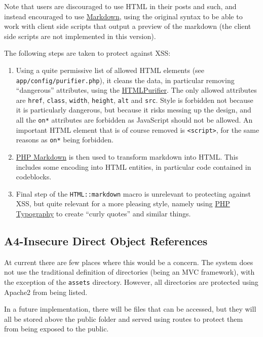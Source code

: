 Note that users are discouraged to use HTML in their posts and such, and
instead encouraged to use
\href{http://daringfireball.net/projects/markdown/}{Markdown}, using the
original syntax to be able to work with client side scripts that output
a preview of the markdown (the client side scripts are not implemented
in this version).

The following steps are taken to protect against XSS:

\begin{enumerate}[1.]
\item
  Using a quite permissive list of allowed HTML elements (see
  \texttt{app/config/purifier.php}), it cleans the data, in particular
  removing ``dangerous'' attributes, using the
  \href{http://htmlpurifier.org/}{HTMLPurifier}. The only allowed
  attributes are \texttt{href}, \texttt{class}, \texttt{width},
  \texttt{height}, \texttt{alt} and \texttt{src}. Style is forbidden not
  because it is particularly dangerous, but because it risks messing up
  the design, and all the \texttt{on*} attributes are forbidden as
  JavaScript should not be allowed. An important HTML element that is of
  course removed is \texttt{\textless{}script\textgreater{}}, for the
  same reasons as \texttt{on*} being forbidden.
\item
  \href{http://michelf.ca/projects/php-markdown/}{PHP Markdown} is then
  used to transform markdown into HTML. This includes some encoding into
  HTML entities, in particular code contained in codeblocks.
\item
  Final step of the \texttt{HTML::markdown} macro is unrelevant to
  protecting against XSS, but quite relevant for a more pleasing style,
  namely using \href{https://github.com/adamaveray/PHPTypography}{PHP
  Typography} to create ``curly quotes'' and similar things.
\end{enumerate}

\subsection{A4-Insecure Direct Object References}

At current there are few places where this would be a concern. The
system does not use the traditional definition of directories (being an
MVC framework), with the exception of the \texttt{assets} directory.
However, all directories are protected using Apache2 from being listed.

In a future implementation, there will be files that can be accessed,
but they will all be stored above the public folder and served using
routes to protect them from being exposed to the public.

